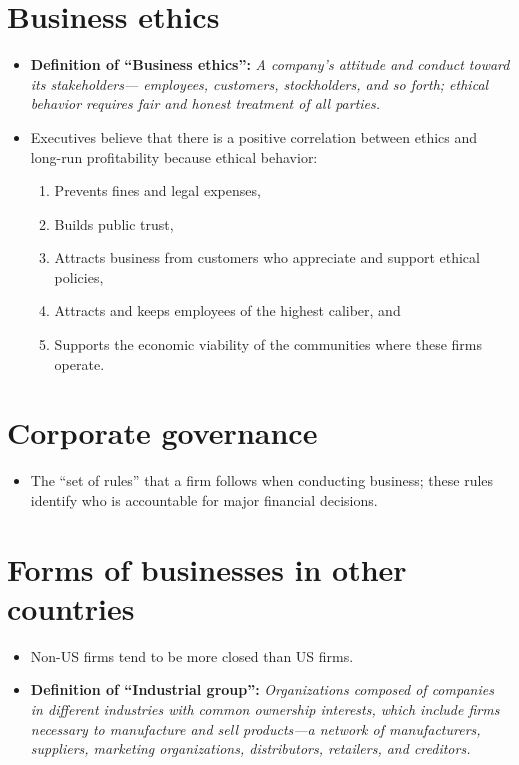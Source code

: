 \documentclass{article}
\renewcommand{\termdefinition}[2]{
    \textbf{Definition of ``#1'':} \emph{#2}
}
\begin{document}
\section{Business ethics}
\begin{itemize}
    \item \termdefinition{Business ethics}{ A company’s attitude and conduct toward its stakeholders— employees, customers, stockholders, and so forth; ethical behavior requires fair and honest treatment of all parties.}
    \item Executives believe that there is a positive correlation between ethics and long-run profitability because ethical behavior:
        \begin{enumerate}
            \item Prevents fines and legal expenses, 
            \item Builds public trust, 
            \item Attracts business from customers who appreciate and support ethical policies, 
            \item Attracts and keeps employees of the highest caliber, and 
            \item Supports the economic viability of the communities where these firms operate. 
        \end{enumerate}
\end{itemize}


\section{Corporate governance}
\begin{itemize}
    \item The ``set of rules'' that a firm follows when conducting business; these rules identify who is accountable for major financial decisions.
\end{itemize}


\section{Forms of businesses in other countries}
\begin{itemize}
    \item Non-US firms tend to be more closed than US firms.
    \item \termdefinition{Industrial group}{ Organizations composed of companies in different industries with common ownership interests, which include firms necessary to manufacture and sell products—a network of manufacturers, suppliers, marketing organizations, distributors, retailers, and creditors.} 
\end{itemize}
\end{document}
